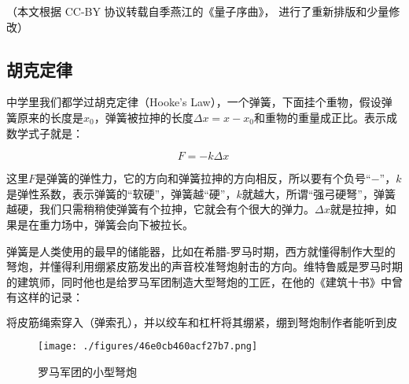 
（本文根据 CC-BY 协议转载自季燕江的《量子序曲》， 进行了重新排版和少量修改）

\subsection{胡克定律}

中学里我们都学过胡克定律（Hooke's Law），一个弹簧，下面挂个重物，假设弹簧原来的长度是$x_0$，弹簧被拉抻的长度$\Delta x = x - x_0$和重物的重量成正比。表示成数学式子就是：

\begin{equation}
F = - k \Delta x~
\end{equation}

这里$F$是弹簧的弹性力，它的方向和弹簧拉抻的方向相反，所以要有个负号“$-$”，$k$是弹性系数，表示弹簧的“软硬”，弹簧越“硬”，$k$就越大，所谓“强弓硬弩”，弹簧越硬，我们只需稍稍使弹簧有个拉抻，它就会有个很大的弹力。$\Delta x$就是拉抻，如果是在重力场中，弹簧会向下被拉长。

弹簧是人类使用的最早的储能器，比如在希腊-罗马时期，西方就懂得制作大型的弩炮，并懂得利用绷紧皮筋发出的声音校准弩炮射击的方向。维特鲁威是罗马时期的建筑师，同时他也是给罗马军团制造大型弩炮的工匠，在他的《建筑十书》中曾有这样的记录：

\begin{equation}
\text{将皮筋绳索穿入（弹索孔），并以绞车和杠杆将其绷紧，绷到弩炮制作者能听到皮筋绳索发出特定音高的弦音，方可用楔子将它固定住。将弩炮的双臂扣上扳机，一旦发射，两边皮筋就应释放出一致的推力。如果它们发出的音调不一致，弩炮射出的弹丸便不可能是直线的}~
\end{equation}

\begin{figure}[ht]
\centering
\texttt{[image: ./figures/46e0cb460acf27b7.png]}
\caption{ 罗马军团的小型弩炮} \label{fig_QMPre4_1}
\end{figure}
